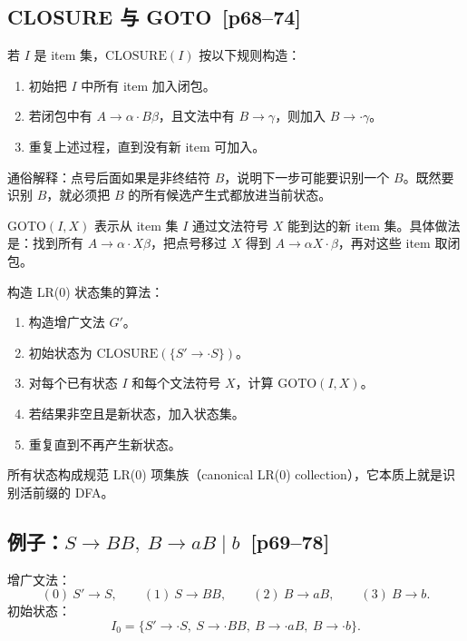 \documentclass[UTF8,fontset=none,11pt]{ctexart}
\newenvironment{defbox}[1][]{%
  \par\medskip\noindent{\color{defrule}\rule{\linewidth}{1.1pt}}\par\nopagebreak
  \noindent{\bfseries\color{defrule}#1}\par\nopagebreak\smallskip}%
  {\par\nopagebreak\smallskip\noindent{\color{defrule}\rule{\linewidth}{0.4pt}}\par\medskip}
\newcommand{\pg}[1]{\texorpdfstring{{\small\color{graytext}\,[p#1]}}{ [p#1]}}
\newcommand{\GOTO}{\ensuremath{\mathrm{GOTO}}}
\newcommand{\CLOSURE}{\ensuremath{\mathrm{CLOSURE}}}
\begin{document}
\subsection{CLOSURE 与 GOTO \pg{68--74}}

\begin{defbox}[CLOSURE]
若 \(I\) 是 item 集，\(\CLOSURE(I)\) 按以下规则构造：
\begin{enumerate}
  \item 初始把 \(I\) 中所有 item 加入闭包。
  \item 若闭包中有 \(A\to\alpha\cdot B\beta\)，且文法中有 \(B\to\gamma\)，则加入 \(B\to\cdot\gamma\)。
  \item 重复上述过程，直到没有新 item 可加入。
\end{enumerate}
\end{defbox}

通俗解释：点号后面如果是非终结符 \(B\)，说明下一步可能要识别一个 \(B\)。既然要识别 \(B\)，就必须把 \(B\) 的所有候选产生式都放进当前状态。

\begin{defbox}[GOTO]
\(\GOTO(I,X)\) 表示从 item 集 \(I\) 通过文法符号 \(X\) 能到达的新 item 集。具体做法是：找到所有 \(A\to\alpha\cdot X\beta\)，把点号移过 \(X\) 得到 \(A\to\alpha X\cdot\beta\)，再对这些 item 取闭包。
\end{defbox}

构造 LR(0) 状态集的算法：

\begin{enumerate}
  \item 构造增广文法 \(G'\)。
  \item 初始状态为 \(\CLOSURE(\{S'\to\cdot S\})\)。
  \item 对每个已有状态 \(I\) 和每个文法符号 \(X\)，计算 \(\GOTO(I,X)\)。
  \item 若结果非空且是新状态，加入状态集。
  \item 重复直到不再产生新状态。
\end{enumerate}

所有状态构成规范 LR(0) 项集族（canonical LR(0) collection），它本质上就是识别活前缀的 DFA。

\subsection{例子：\texorpdfstring{\(S\to BB,\ B\to aB\mid b\)}{S -> BB, B -> aB | b} \pg{69--78}}

增广文法：
\[
(0)\ S'\to S,\qquad (1)\ S\to BB,\qquad (2)\ B\to aB,\qquad (3)\ B\to b.
\]
初始状态：
\[
I_0=\{S'\to\cdot S,\ S\to\cdot BB,\ B\to\cdot aB,\ B\to\cdot b\}.
\]
\end{document}
